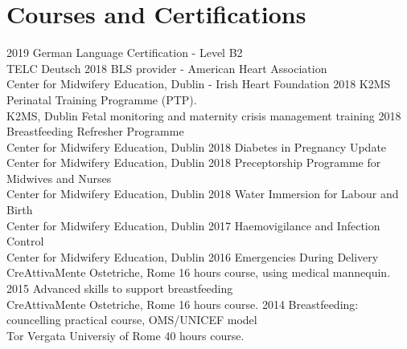 \documentclass[11pt]{friggeri-cv}
\begin{document}
\section{Courses and Certifications}
\begin{entrylist}
  \entry
    {2019}
    {German Language Certification - Level B2}
    {\\TELC Deutsch}
    {\vspace{-10pt}}
  \entry
    {2018}
    {BLS provider - American Heart Association}
    {\\Center for Midwifery Education, Dublin - Irish Heart Foundation}
    {\vspace{-10pt}}
  \entry
    {2018}
    {K2MS Perinatal Training Programme (PTP).}
    {\\K2MS, Dublin}
    {Fetal monitoring and maternity crisis management training}
  \entry
    {2018}
    {Breastfeeding Refresher Programme}
    {\\Center for Midwifery Education, Dublin}
    {\vspace{-10pt}}
  \entry
    {2018}
    {Diabetes in Pregnancy Update}
    {\\Center for Midwifery Education, Dublin}
    {\vspace{-10pt}}
  \entry
    {2018}
    {Preceptorship Programme for Midwives and Nurses}
    {\\Center for Midwifery Education, Dublin}
    {\vspace{-10pt}}
  \entry
    {2018}
    {Water Immersion for Labour and Birth}
    {\\Center for Midwifery Education, Dublin}
    {\vspace{-10pt}}
  \entry
    {2017}
    {Haemovigilance and Infection Control}
    {\\Center for Midwifery Education, Dublin}
    {\vspace{-10pt}}
  \entry
    {2016}
    {Emergencies During Delivery}
    {\\CreAttivaMente Ostetriche, Rome}
    {16 hours course, using medical mannequin.}
  \entry
    {2015}
    {Advanced skills to support breastfeeding}
    {\\CreAttivaMente Ostetriche, Rome}
    {16 hours course.}
  \entry
    {2014}
    {Breastfeeding: councelling practical course, OMS/UNICEF model}
    {\\Tor Vergata Universiy of Rome}
    {40 hours course.}
\end{entrylist}
\newpage

\end{document}
